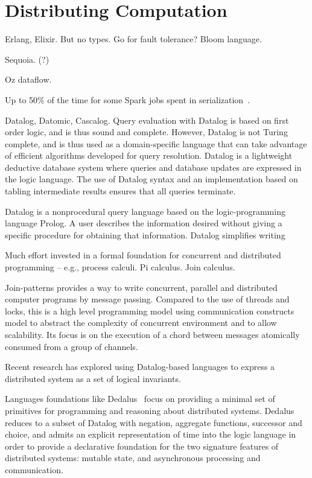 \section{Distributing Computation}



Erlang, Elixir. But no types. Go for fault tolerance? Bloom language.

Sequoia. (?)

Oz dataflow.

Up to 50\% of the time for some Spark jobs spent in
serialization~\cite{OusterhoutSerialization}.

Datalog, Datomic, Cascalog. Query evaluation with Datalog is based on first
order logic, and is thus sound and complete. However, Datalog is not Turing
complete, and is thus used as a domain-specific language that can take advantage
of efficient algorithms developed for query resolution. Datalog is a lightweight
deductive database system where queries and database updates are expressed in
the logic language. The use of Datalog syntax and an implementation based on
tabling intermediate results ensures that all queries terminate.

Datalog is a nonprocedural query language based on the logic-programming
language Prolog.  A user describes the information desired without giving a
specific procedure for obtaining that information. Datalog simplifies writing

Much effort invested in a formal foundation for concurrent and distributed
programming -- e.g., process calculi. Pi calculus. Join calculus.

Join-patterns provides a way to write concurrent, parallel and distributed
computer programs by message passing. Compared to the use of threads and locks,
this is a high level programming model using communication constructs model to
abstract the complexity of concurrent environment and to allow scalability. Its
focus is on the execution of a chord between messages atomically consumed from a
group of channels.

Recent research has explored using Datalog-based languages to express a
distributed system as a set of logical invariants.

Languages foundations like Dedalus~\cite{Dedalus} focus on providing a minimal set of
primitives for programming and reasoning about distributed systems. Dedalus
reduces to a subset of Datalog with negation, aggregate functions,
successor and choice, and admits an explicit representation of time into the
logic language in order to provide a declarative foundation for the two
signature features of distributed systems: mutable state, and asynchronous
processing and communication.

